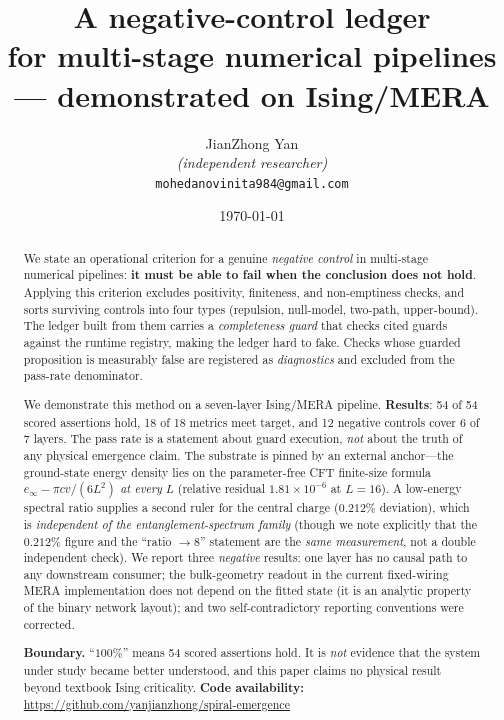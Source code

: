 \documentclass[11pt,a4paper]{article}
\title{\bfseries A negative-control ledger  \\[2pt]
for multi-stage numerical pipelines \\[8pt]
\large --- demonstrated on Ising/MERA\\}
\author{%
   JianZhong Yan\\
  \small \textit{(independent researcher)}\\
  \small \texttt{mohedanovinita984@gmail.com}\\
}
\date{\today}
\begin{document}
\maketitle

\begin{abstract}
\noindent
We state an operational criterion for a genuine \emph{negative control} in
multi-stage numerical pipelines: \textbf{it must be able to fail when the
conclusion does not hold}. Applying this criterion excludes positivity,
finiteness, and non-emptiness checks, and sorts surviving controls into four types
(repulsion, null-model, two-path, upper-bound). The ledger built from them carries
a \emph{completeness guard} that checks cited guards against the runtime registry,
making the ledger hard to fake. Checks whose guarded proposition is measurably
false are registered as \emph{diagnostics} and excluded from the pass-rate
denominator.

We demonstrate this method on a seven-layer Ising/MERA pipeline.
\textbf{Results}: 54 of 54 scored assertions hold, 18 of 18 metrics meet target,
and 12 negative controls cover 6 of 7 layers. The pass rate is a statement about
guard execution, \emph{not} about the truth of any physical emergence claim. The
substrate is pinned by an external anchor---the ground-state energy density lies
on the parameter-free CFT finite-size formula $e_\infty-\pi cv/(6L^2)$ \emph{at
every} $L$ (relative residual $1.81\times10^{-6}$ at $L{=}16$). A low-energy
spectral ratio supplies a second ruler for the central charge
($0.212\%$ deviation), which is \emph{independent of the entanglement-spectrum
family} (though we note explicitly that the $0.212\%$ figure and the
``ratio $\to 8$'' statement are the \emph{same measurement}, not a double
independent check). We report three \emph{negative} results: one layer has no
causal path to any downstream consumer; the bulk-geometry readout in the current
fixed-wiring MERA implementation does not depend on the fitted state (it is an
analytic property of the binary network layout); and two self-contradictory
reporting conventions were corrected.

\smallskip
\noindent\textbf{Boundary.} ``$100\%$'' means 54 scored assertions hold. It is
\emph{not} evidence that the system under study became better understood, and this
paper claims no physical result beyond textbook Ising criticality.
\textbf{Code availability:} \url{https://github.com/yanjianzhong/spiral-emergence}
\end{abstract}
\end{document}
